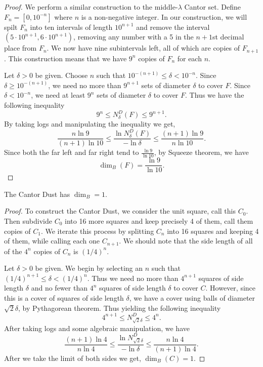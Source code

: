 \begin{proof}
	We perform a similar construction to the middle-$\lambda$ Cantor set.
	Define $F_n=[0,10^{-n}]$ where $n$ is a non-negative integer.
	In our construction, we will spilt $F_n$ into ten intervals of length $10^{n+1}$ and remove the interval $(5\cdot10^{n+1},6\cdot10^{n+1})$, removing any number with a 5 in the $n+1$st decimal place from $F_n$.
	We now have nine subintervals left, all of which are copies of $F_{n+1}$.
	This construction means that we have $9^n$ copies of $F_n$ for each $n$.

	Let $\delta >0$ be given.
	Choose $n$ such that $10^{-(n+1)}\leq \delta<10^{-n}$.
	Since $\delta\geq 10^{-(n+1)}$, we need no more than $9^{n+1}$ sets of diameter $\delta$ to cover $F$.
	Since $\delta<10^{-n}$, we need at least $9^n$ sets of diameter $\delta$ to cover $F$.
	Thus we have the following inequality
	\[
		9^n \leq N^D_\delta(F)\leq 9^{n+1}.
	\]
	By taking logs and manipulating the inequality we get,
	\[
		\frac{n\ln 9}{(n+1)\ln 10}\leq\frac{\ln N^D_\delta(F)}{-\ln\delta}\leq \frac{(n+1)\ln9}{n\ln 10}.
	\]
	Since both the far left and far right tend to $\frac{\ln9}{\ln10}$, by Squeeze theorem, we have
	\[
		\dim_B(F)=\frac{\ln9}{\ln10}.
	\]
\end{proof}

\begin{example}
	The Cantor Dust has $\dim_B=1$.
\end{example}

\begin{proof}
	To construct the Cantor Dust, we consider the unit square, call this $C_0$.
	Then subdivide $C_0$ into 16 more squares and keep precisely 4 of them, call them copies of $C_1$.
	We iterate this process by splitting $C_n$ into 16 squares and keeping 4 of them, while calling each one $C_{n+1}$.
	We should note that the side length of all of the $4^n$ copies of $C_n$ is ${(1/4)}^n$.

	Let $\delta>0$ be given.
	We begin by selecting an $n$ such that ${(1/4)}^{n+1}\leq \delta< {(1/4)}^n$.
	Thus we need no more than $4^{n+1}$ squares of side length $\delta$ and no fewer than $4^n$ squares of side length $\delta$ to cover $C$.
	However, since this is a cover of squares of side length $\delta$, we have a cover using balls of diameter $\sqrt{2}\delta$, by Pythagorean theorem.
	Thus yielding the following inequality
	\[
		4^{n+1}\leq N^D_{\sqrt{2}\delta}\leq 4^n.
	\]
	After taking logs and some algebraic manipulation, we have
	\[
		\frac{(n+1)\ln4}{n\ln4}\leq \frac{\ln N^D_{\sqrt{2}\delta}}{-\ln\delta}\leq \frac{n\ln4}{(n+1)\ln4}.
	\]
	After we take the limit of both sides we get, $\dim_B(C)=1$.
\end{proof}

